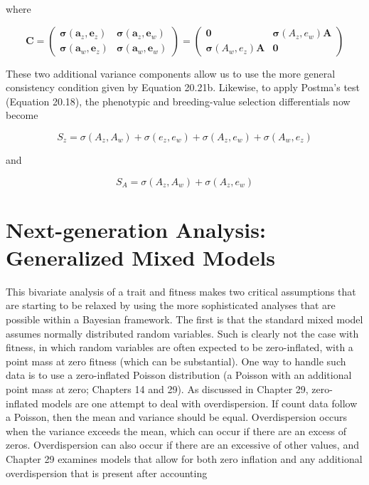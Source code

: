 \documentclass{article}
\begin{document}
where

\begin{equation}
\mathbf{C}=\begin{pmatrix}\boldsymbol{\sigma}(\mathbf{a}_{z},\mathbf{e}_{z})&\boldsymbol{\sigma}(\mathbf{a}_{z},\mathbf{e}_{w})\\\boldsymbol{\sigma}(\mathbf{a}_{w},\mathbf{e}_{z})&\boldsymbol{\sigma}(\mathbf{a}_{w},\mathbf{e}_{w})\end{pmatrix}=\begin{pmatrix}\mathbf{0}&\boldsymbol{\sigma}(A_{z},e_{w})\mathbf{A}\\\boldsymbol{\sigma}(A_{w},e_{z})\mathbf{A}&\mathbf{0}\end{pmatrix}
\tag{20.29b}
\label{eq:20_29b}
\end{equation}

These two additional variance components allow us to use the more general consistency condition given by Equation 20.21b. Likewise, to apply Postma's test (Equation 20.18), the phenotypic and breeding-value selection differentials now become

\begin{equation}
S_{z}=\sigma(A_{z},A_{w})+\sigma(e_{z},e_{w})+\sigma(A_{z},e_{w})+\sigma(A_{w},e_{z})
\tag{20.29c}
\label{eq:20_29c}
\end{equation}

and

\begin{equation}
S_{A}=\sigma(A_{z},A_{w})+\sigma(A_{z},e_{w})
\tag{20.29d}
\label{eq:20_29d}
\end{equation}

\section{Next-generation Analysis: Generalized Mixed Models}
This bivariate analysis of a trait and fitness makes two critical assumptions that are starting to be relaxed by using the more sophisticated analyses that are possible within a Bayesian framework. The first is that the standard mixed model assumes normally distributed random variables. Such is clearly not the case with fitness, in which random variables are often expected to be zero-inflated, with a point mass at zero fitness (which can be substantial). One way to handle such data is to use a zero-inflated Poisson distribution (a Poisson with an additional point mass at zero; Chapters 14 and 29). As discussed in Chapter 29, zero-inflated models are one attempt to deal with overdispersion. If count data follow a Poisson, then the mean and variance should be equal. Overdispersion occurs when the variance exceeds the mean, which can occur if there are an excess of zeros. Overdispersion can also occur if there are an excessive of other values, and Chapter 29 examines models that allow for both zero inflation and any additional overdispersion that is present after accounting
\end{document}
